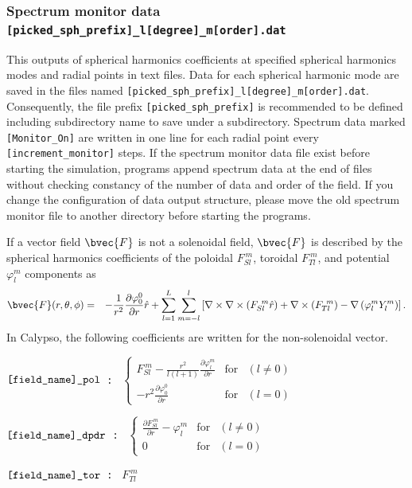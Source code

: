 \subsubsection{Spectrum monitor data \\
{\tt [picked\_sph\_prefix]\_l[degree]\_m[order].dat}}
\label{sec:pickup_spectr_ctl}
This outputs of spherical harmonics coefficients at specified spherical harmonics modes and radial points in text files. Data for each spherical harmonic mode are saved in the files named {\tt [picked\_sph\_prefix]\_l[degree]\_m[order].dat}. Consequently, the file prefix {\tt [picked\_sph\_prefix]} is recommended to be defined including subdirectory name to save under a subdirectory. Spectrum data marked \verb|[Monitor_On]| are written in one line for each radial point every \verb|[increment_monitor]| steps. If the spectrum monitor data file exist before starting the simulation, programs append spectrum data at the end of files without checking constancy of the number of data and order of the field. If you change the configuration of data output structure, please move the old spectrum monitor file to another directory before starting the programs.

If a vector field $\bvec{F}$ is not a solenoidal field, $\bvec{F}$ is described by the spherical harmonics coefficients of the poloidal $F_{Sl}^{\ m}$, toroidal $F_{Tl}^{\ m}$, and potential $\varphi_{l}^{m}$ components as
\begin{eqnarray}
\bvec{F}(r, \theta, \phi) & = &  - \frac{1}{r^{2}}\frac{\partial \varphi_{0}^{0}}{\partial r} \hat{r}
 + \sum_{l=1}^{L} \sum_{m=-l}^{l} 
\left[\nabla \times \nabla \times \left( F_{Sl}^{\ m} \hat{r} \right) +  \nabla \times \left(F_{Tl}^{\ m}\right)
 - \nabla \left(\varphi_{l}^{m} Y_{l}^{m} \right)\right].
\nonumber
\end{eqnarray}
In Calypso, the following coefficients are written for the non-solenoidal vector.
\begin{description}
\item{\tt  $\verb|[field_name]_pol|$ : }
 $\left\{\begin{array}{ccr}
\displaystyle{
F_{Sl}^{\ m} - \frac{r^{2}}{l \left(l+1\right)} \frac{\partial \varphi_{l}^{m}}{\partial r} }
& \mbox{for} & \left (l \ne 0 \right)\\
\displaystyle{
 -r^{2} \frac{\partial \varphi_{0}^{0}}{\partial r}
} & \mbox{for} & \left (l = 0 \right)
\end{array}
\right.$
\item{\tt  $\verb|[field_name]_dpdr|$ : } 
$
\left\{
\begin{array}{ccr}
\displaystyle{
\frac{\partial F_{Sl}^{\ m}}{\partial r} - \varphi_{l}^{m}}
 & \mbox{for} & \left (l \ne 0 \right)\\
 0 & \mbox{for} & \left (l = 0 \right)
\end{array}
\right. $
\item{\tt  $\verb|[field_name]_tor|$ : }  $F_{Tl}^{\ m}$
\end{description}


